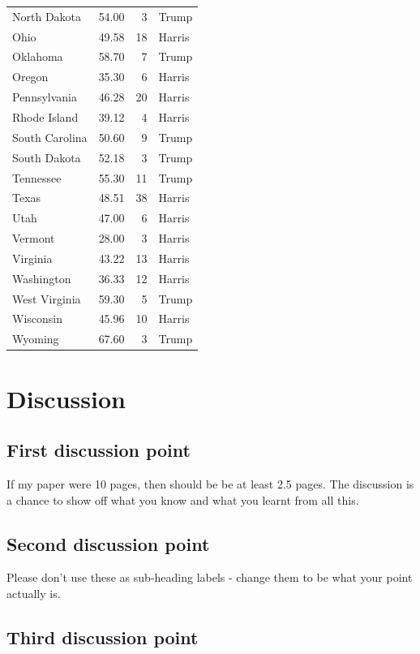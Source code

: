 \documentclass[
  letterpaper,
  DIV=11,
  numbers=noendperiod]{scrartcl}
\begin{document}
\begin{longtable}[]{@{}lrrl@{}}
North Dakota & 54.00 & 3 & Trump \\
Ohio & 49.58 & 18 & Harris \\
Oklahoma & 58.70 & 7 & Trump \\
Oregon & 35.30 & 6 & Harris \\
Pennsylvania & 46.28 & 20 & Harris \\
Rhode Island & 39.12 & 4 & Harris \\
South Carolina & 50.60 & 9 & Trump \\
South Dakota & 52.18 & 3 & Trump \\
Tennessee & 55.30 & 11 & Trump \\
Texas & 48.51 & 38 & Harris \\
Utah & 47.00 & 6 & Harris \\
Vermont & 28.00 & 3 & Harris \\
Virginia & 43.22 & 13 & Harris \\
Washington & 36.33 & 12 & Harris \\
West Virginia & 59.30 & 5 & Trump \\
Wisconsin & 45.96 & 10 & Harris \\
Wyoming & 67.60 & 3 & Trump \\

\end{longtable}

\section{Discussion}\label{discussion}

\subsection{First discussion point}\label{sec-first-point}

If my paper were 10 pages, then should be be at least 2.5 pages. The
discussion is a chance to show off what you know and what you learnt
from all this.

\subsection{Second discussion point}\label{second-discussion-point}

Please don't use these as sub-heading labels - change them to be what
your point actually is.

\subsection{Third discussion point}\label{third-discussion-point}
\end{document}
